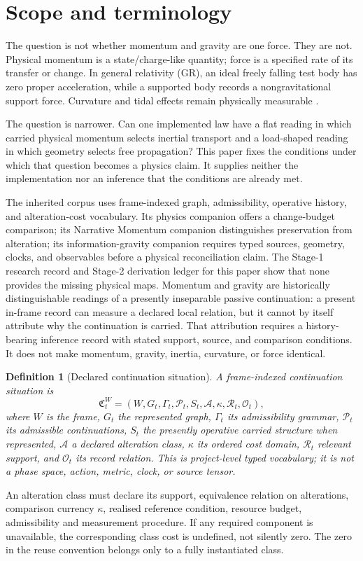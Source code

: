 \documentclass[11pt,a4paper]{article}
\newtheorem{definition}{Definition}[section]
\theoremstyle{remark}
\newcommand{\Cont}{\mathfrak C}
\newcommand{\Alt}{\mathcal A}
\newcommand{\Obs}{\mathcal O}
\begin{document}
\section{Scope and terminology}\label{sec:scope}
The question is not whether momentum and gravity are one force. They are not.
Physical momentum is a state/charge-like quantity; force is a specified rate of
its transfer or change. In general relativity (GR), an ideal freely falling test
body has zero proper acceleration, while a supported body records a
nongravitational support force. Curvature and tidal effects remain physically
measurable \citep{einstein1916,gerochjang1975,will2014}.

The question is narrower. Can one implemented law have a flat reading in which
carried physical momentum selects inertial transport and a load-shaped reading
in which geometry selects free propagation? This paper fixes the conditions
under which that question becomes a physics claim. It supplies neither the
implementation nor an inference that the conditions are already met.

The inherited corpus uses frame-indexed graph, admissibility, operative
history, and alteration-cost vocabulary. Its physics companion offers a
change-budget comparison; its Narrative Momentum companion distinguishes
preservation from alteration; its information-gravity companion requires typed
sources, geometry, clocks, and observables before a physical reconciliation
claim. The Stage-1 research record and Stage-2 derivation ledger for this paper
show that none provides the missing physical maps. Momentum and gravity are
historically distinguishable readings of a presently inseparable passive
continuation: a present in-frame record can measure a declared local relation,
but it cannot by itself attribute why the continuation is carried. That
attribution requires a history-bearing inference record with stated support,
source, and comparison conditions. It does not make momentum, gravity, inertia,
curvature, or force identical.

\begin{definition}[Declared continuation situation]\label{def:situation}
A frame-indexed continuation situation is
\[
 \Cont_t^W=(W,G_t,\Gamma_t,\mathcal P_t,S_t,\Alt,\kappa,\mathcal R_t,\Obs_t),
\]
where $W$ is the frame, $G_t$ the represented graph, $\Gamma_t$ its
admissibility grammar, $\mathcal P_t$ its admissible continuations, $S_t$ the
presently operative carried structure when represented, $\Alt$ a declared
alteration class, $\kappa$ its ordered cost domain, $\mathcal R_t$ relevant
support, and $\Obs_t$ its record relation. This is project-level typed
vocabulary; it is not a phase space, action, metric, clock, or source tensor.
\end{definition}
An alteration class must declare its support, equivalence relation on
alterations, comparison currency $\kappa$, realised reference condition,
resource budget, admissibility and measurement procedure. If any required
component is unavailable, the corresponding class cost is undefined, not
silently zero. The zero in the reuse convention belongs only to a fully
instantiated class.
\end{document}
